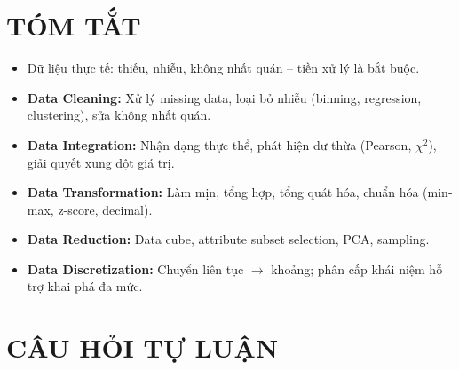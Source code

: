 \documentclass[10pt]{article}
\begin{document}
\section{TÓM TẮT}

\begin{itemize}
    \item Dữ liệu thực tế: thiếu, nhiễu, không nhất quán -- tiền xử lý là bắt buộc.
    \item \textbf{Data Cleaning:} Xử lý missing data, loại bỏ nhiễu (binning, regression, clustering), sửa không nhất quán.
    \item \textbf{Data Integration:} Nhận dạng thực thể, phát hiện dư thừa (Pearson, $\chi^2$), giải quyết xung đột giá trị.
    \item \textbf{Data Transformation:} Làm mịn, tổng hợp, tổng quát hóa, chuẩn hóa (min-max, z-score, decimal).
    \item \textbf{Data Reduction:} Data cube, attribute subset selection, PCA, sampling.
    \item \textbf{Data Discretization:} Chuyển liên tục $\to$ khoảng; phân cấp khái niệm hỗ trợ khai phá đa mức.
\end{itemize}

\newpage
\section{CÂU HỎI TỰ LUẬN}
\end{document}
